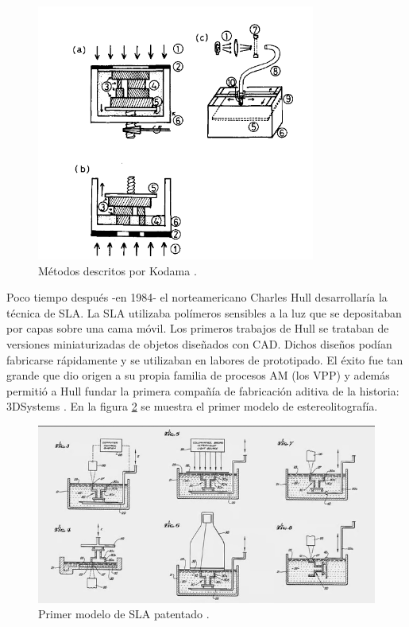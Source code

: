 \begin{figure}[h!]
    \centering
    \includegraphics[scale=0.5]{figuras/metodos_Kodama1981.png}
    \caption{Métodos descritos por Kodama \cite{Kodama1981}.}
    \label{fig:metodos_Kodama1981}
\end{figure}

Poco tiempo después -en 1984- el norteamericano Charles Hull desarrollaría la técnica de \acrfull{SLA}. La \acrlong{SLA} utilizaba polímeros sensibles a la luz que se depositaban por capas sobre una cama móvil. Los primeros trabajos de Hull se trataban de versiones miniaturizadas de objetos diseñados con \acrshort{CAD}. Dichos diseños podían fabricarse rápidamente y se utilizaban en labores de prototipado. El éxito fue tan grande que dio origen a su propia familia de procesos \acrshort{AM} (los \acrshort{VPP}) y además permitió a Hull fundar la primera compañía de fabricación aditiva de la historia: 3DSystems \cite{web_3DSystems}. En la figura \ref{fig:patente_sla} se muestra el primer modelo de estereolitografía. \label{sec:esterilitografia}

\begin{figure}[h!]
    \centering
    \includegraphics[scale=0.30]{figuras/patente_sla.png}
    \caption{Primer modelo de \acrshort{SLA} patentado \cite{Hull1984}.}
    \label{fig:patente_sla}
\end{figure}

